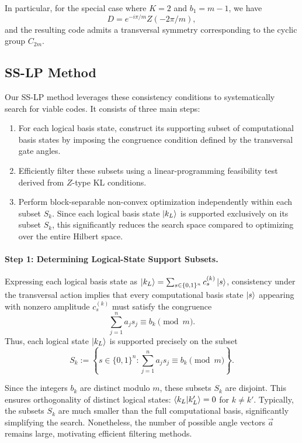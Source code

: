 \documentclass[8pt]{article}
\theoremstyle{definition}
\begin{document}
In particular, for the special case where $K=2$ and $b_1 = m-1$, we have
\[
    D = e^{-i\pi/m} Z(-2\pi/m),
\]
and the resulting code admits a transversal symmetry corresponding to the cyclic group $C_{2m}$.

\subsection{SS-LP Method}
Our SS-LP method leverages these consistency conditions to systematically search for viable codes. It consists of three main steps:
\begin{enumerate}
    \item For each logical basis state, construct its supporting subset of computational basis states by imposing the congruence condition defined by the transversal gate angles.
    \item Efficiently filter these subsets using a linear-programming feasibility test derived from $Z$-type KL conditions.
    \item Perform block-separable non-convex optimization independently within each subset \( S_k \). Since each logical basis state \(\ket{k_L}\) is supported exclusively on its subset \( S_k \), this significantly reduces the search space compared to optimizing over the entire Hilbert space.

\end{enumerate}

\paragraph{Step 1: Determining Logical-State Support Subsets.}
Expressing each logical basis state as $\ket{k_L} = \sum_{s\in\{0,1\}^n} c_s^{(k)}\ket{s}$, consistency under the transversal action implies that every computational basis state $\ket{s}$ appearing with nonzero amplitude $c_s^{(k)}$ must satisfy the congruence
\[
    \sum_{j=1}^n a_j s_j \equiv b_k \pmod{m}.
\]
Thus, each logical state $\ket{k_L}$ is supported precisely on the subset
\[
    S_k := \left\{ s\in\{0,1\}^n : \sum_{j=1}^n a_j s_j \equiv b_k \pmod{m}\right\}.
\]

Since the integers $b_k$ are distinct modulo $m$, these subsets $S_k$ are disjoint. This ensures orthogonality of distinct logical states: $\braket{k_L|k_L'} = 0$ for $k\ne k'$. Typically, the subsets $S_k$ are much smaller than the full computational basis, significantly simplifying the search. Nonetheless, the number of possible angle vectors $\vec{a}$ remains large, motivating efficient filtering methods.
\end{document}
